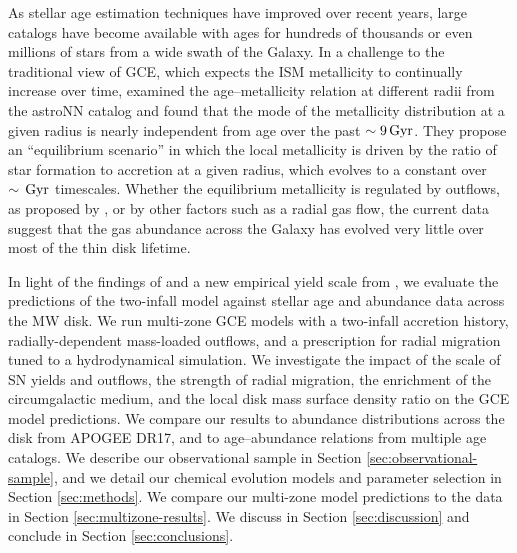 \documentclass[twocolumn,twocolappendix,linenumbers]{aastex631}
\newcommand{\todo}[1]{{\color{red}#1}}
\newcommand{\Gyr}{\,{\rm Gyr}}
\begin{document}
As stellar age estimation techniques have improved over recent years, large catalogs have become available with ages for hundreds of thousands or even millions of stars from a wide swath of the Galaxy. In a challenge to the traditional view of GCE, which expects the ISM metallicity to continually increase over time, \citet{johnson_milky_2024} examined the age--metallicity relation at different radii from the astroNN catalog \citep{mackereth_dynamical_2019} and found that the mode of the metallicity distribution at a given radius is nearly independent from age over the past $\sim9\Gyr$. They propose an ``equilibrium scenario'' in which the local metallicity is driven by the ratio of star formation to accretion at a given radius, which evolves to a constant over $\sim\Gyr$ timescales. Whether the equilibrium metallicity is regulated by outflows, as proposed by \citet{johnson_milky_2024}, or by other factors such as a radial gas flow, the current data suggest that the gas abundance across the Galaxy has evolved very little over most of the thin disk lifetime.


In light of the findings of \citet{johnson_milky_2024} and a new empirical yield scale from \citet{weinberg_scale_2024}, we evaluate the predictions of the two-infall model against stellar age and abundance data across the MW disk.
We run multi-zone GCE models with a two-infall accretion history, radially-dependent mass-loaded outflows, and a prescription for radial migration tuned to a hydrodynamical simulation. We investigate the impact of the scale of SN yields and outflows, the strength of radial migration, the enrichment of the circumgalactic medium, and the local disk mass surface density ratio on the GCE model predictions. We compare our results to abundance distributions across the disk from APOGEE DR17, and to age--abundance relations from multiple age catalogs. We describe our observational sample in Section \ref{sec:observational-sample}, and we detail our chemical evolution models and parameter selection in Section \ref{sec:methods}. We compare our multi-zone model predictions to the data in Section \ref{sec:multizone-results}. We discuss in Section \ref{sec:discussion} and conclude in Section \ref{sec:conclusions}.
\end{document}
